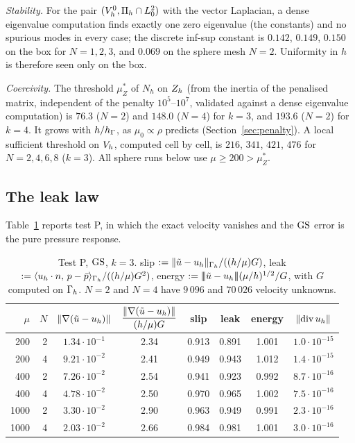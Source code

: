\emph{Stability.} For the pair $(V_h^0,\Pi_h\cap L^2_0)$ with the vector Laplacian, a dense eigenvalue computation finds exactly one zero eigenvalue (the constants) and no spurious modes in every case; the discrete inf-sup constant is $0.142$, $0.149$, $0.150$ on the box for $N=1,2,3$, and $0.069$ on the sphere mesh $N=2$. Uniformity in $h$ is therefore seen only on the box.

\emph{Coercivity.} The threshold $\mu_Z^\ast$ of $N_h$ on $Z_h$ (from the inertia of the penalised matrix, independent of the penalty $10^5$--$10^7$, validated against a dense eigenvalue computation) is $76.3$ ($N=2$) and $148.0$ ($N=4$) for $k=3$, and $193.6$ ($N=2$) for $k=4$. It grows with $h/h_\Gamma$, as $\mu_0\propto\rho$ predicts (Section~\ref{sec:penalty}). A local sufficient threshold on $V_h$, computed cell by cell, is $216$, $341$, $421$, $476$ for $N=2,4,6,8$ ($k=3$). All sphere runs below use $\mu\ge200>\mu_Z^\ast$.

\subsection{The leak law}
Table~\ref{tab:leak} reports test P, in which the exact velocity vanishes and the $\mathrm{GS}$ error is the pure pressure response.
\begin{table}[ht]
\centering\small
\caption{Test P, $\mathrm{GS}$, $k=3$. slip $:=\lVert \tilde u-u_h\rVert_{\Gamma_h}/((h/\mu)G)$, leak $:=\langle u_h\cdot n,\, p-\bar p\rangle_{\Gamma_h}/((h/\mu)G^2)$, energy $:=|\!|\!|\tilde u-u_h|\!|\!|(\mu/h)^{1/2}/G$, with $G$ computed on $\Gamma_h$. $N=2$ and $N=4$ have $9\,096$ and $70\,026$ velocity unknowns.}\label{tab:leak}
\begin{tabular}{rrcccccc}
\toprule
$\mu$ & $N$ & $\lVert \nabla(\tilde u-u_h)\rVert$ & $\dfrac{\lVert \nabla(\tilde u-u_h)\rVert}{(h/\mu)G}$ & slip & leak & energy & $\lVert \operatorname{div} u_h\rVert$\\
\midrule
200&2&$1.34\cdot10^{-1}$&2.34&0.913&0.891&1.001&$1.0\cdot10^{-15}$\\
200&4&$9.21\cdot10^{-2}$&2.41&0.949&0.943&1.012&$1.4\cdot10^{-15}$\\
400&2&$7.26\cdot10^{-2}$&2.54&0.941&0.923&0.992&$8.7\cdot10^{-16}$\\
400&4&$4.78\cdot10^{-2}$&2.50&0.970&0.965&1.002&$7.5\cdot10^{-16}$\\
1000&2&$3.30\cdot10^{-2}$&2.90&0.963&0.949&0.991&$2.3\cdot10^{-16}$\\
1000&4&$2.03\cdot10^{-2}$&2.66&0.984&0.981&1.001&$3.0\cdot10^{-16}$\\
\bottomrule
\end{tabular}
\end{table}

